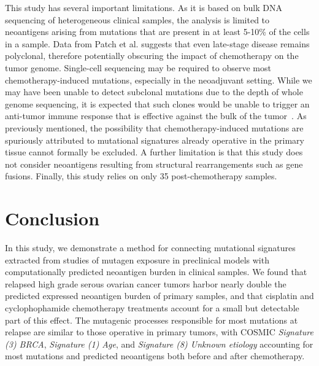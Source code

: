 \documentclass[linenumbers]{bmcart}
\begin{document}
This study has several important limitations. As it is based on bulk DNA sequencing of heterogeneous clinical samples, the analysis is limited to neoantigens arising from mutations that are present in at least 5-10\% of the cells in a sample. Data from Patch et al. suggests that even late-stage disease remains polyclonal, therefore potentially obscuring the impact of chemotherapy on the tumor genome. Single-cell sequencing may be required to observe most chemotherapy-induced mutations, especially in the neoadjuvant setting. While we may have been unable to detect subclonal mutations due to the depth of whole genome sequencing, it is expected that such clones would be unable to trigger an anti-tumor immune response that is effective against the bulk of the tumor~\cite{McGranahan_2016}.  As previously mentioned, the possibility that chemotherapy-induced mutations are spuriously attributed to mutational signatures already operative in the primary tissue cannot formally be excluded. A further limitation is that this study does not consider neoantigens resulting from structural rearrangements such as gene fusions. Finally, this study relies on only 35 post-chemotherapy samples.

\section*{Conclusion}
In this study, we demonstrate a method for connecting mutational signatures extracted from studies of mutagen exposure in preclinical models with computationally predicted neoantigen burden in clinical samples. We found that relapsed high grade serous ovarian cancer tumors harbor nearly double the predicted expressed neoantigen burden of primary samples, and that cisplatin and cyclophophamide chemotherapy treatments account for a small but detectable part of this effect. The mutagenic processes responsible for most mutations at relapse are similar to those operative in primary tumors, with COSMIC \textit{Signature (3) BRCA}, \textit{Signature (1) Age}, and \textit{Signature (8) Unknown etiology} accounting for most mutations and predicted neoantigens both before and after chemotherapy.


\end{document}
